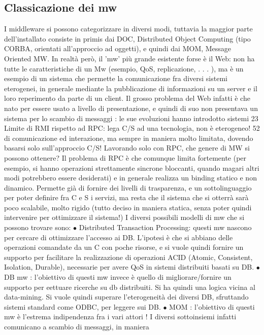 \subsection{Classicazione dei mw}
I middleware si possono categorizzare in diversi modi, tuttavia la maggior parte
dell'installato consiste in primis dai DOC, Distributed Object Computing (tipo
CORBA, orientati all'approccio ad oggetti), e quindi dai MOM, Message Oriented MW. In realtà però, il 'mw' più grande
esistente forse è il Web: non ha
tutte le caratteristiche di un Mw (esempio, QoS, replicazione, . . . ), ma è un
esempio di un sistema che permette la comunicazione fra diversi sistemi eterogenei, in generale mediante la
pubblicazione di informazioni su un server e il loro
reperimento da parte di un client. Il grosso problema del Web infatti è che nato
per essere usato a livello di presentazione, e quindi di suo non presentava un
sistema per lo scambio di messaggi : le sue evoluzioni hanno introdotto sistemi
23 Limite
di RMI rispetto ad RPC: lega C/S ad una tecnologia, non è eterogeneo!
52
di comunicazione ed interazione, ma sempre in maniera molto limitata, dovendo
basarsi solo sull'approccio C/S!
Lavorando solo con RPC, che genere di MW si possono ottenere? Il problema
di RPC è che comunque limita fortemente (per esempio, si hanno operazioni
strettamente sincrone bloccanti, quando magari altri modi potrebbero essere
desiderati) e in generale realizza un binding statico e non dinamico. Permette
già di fornire dei livelli di trasparenza, e un sottolinguaggio per poter definire
fra C e S i servizi, ma resta che il sistema che si otterrà sarà poco scalabile,
molto rigido (tutto deciso in maniera statica, senza poter quindi intervenire per
ottimizzare il sistema!)
I diversi possibili modelli di mw che si possono trovare sono:
$\bullet$ Distributed Transaction Processing: questi mw nascono per cercare di
ottimizzare l'accesso ai DB. L'ipotesi è che si abbiano delle operazioni
comandate da un C con poche risorse, e si vuole quindi fornire un supporto
per facilitare la realizzazione di operazioni ACID (Atomic, Consistent,
Isolation, Durable), necessarie per avere QoS in sistemi distribuiti basati
su DB.
$\bullet$ DB mw : l'obiettivo di questi mw invece è quello di migliorare/fornire un
supporto per eettuare ricerche su db distribuiti. Si ha quindi una logica
vicina al data-mining. Si vuole quindi superare l'eterogeneità dei diversi
DB, sfruttando sistemi standard come ODBC, per leggere sui DB.
$\bullet$ MOM : l'obiettivo di questi mw è l'estrema indipendenza fra i vari attori ! I
diversi sottoinsiemi infatti comunicano a scambio di messaggi, in maniera
